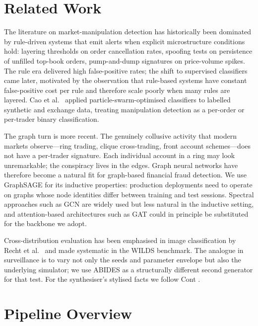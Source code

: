 \documentclass[10pt,twocolumn,letterpaper]{article}
\begin{document}
\section{Related Work}
\label{sec:related}

The literature on market-manipulation detection has historically been
dominated by rule-driven systems that emit alerts when explicit
microstructure conditions hold: layering thresholds on order
cancellation rates, spoofing tests on persistence of unfilled top-book
orders, pump-and-dump signatures on price-volume spikes. The rule era
delivered high false-positive rates; the shift to supervised classifiers
came later, motivated by the
observation that rule-based systems have constant false-positive cost
per rule and therefore scale poorly when many rules are layered.
Cao et al.\ \cite{cao2014pso} applied particle-swarm-optimised
classifiers to labelled synthetic and exchange data, treating
manipulation detection as a per-order or per-trader binary
classification.

The graph turn is more recent. The genuinely collusive activity that
modern markets observe---ring trading, clique cross-trading, front
account schemes---does not have a per-trader signature. Each individual
account in a ring may look unremarkable; the conspiracy lives in the
edges. Graph neural networks have therefore become a natural fit for
graph-based financial fraud detection. We use GraphSAGE
\cite{hamilton2017graphsage} for its inductive properties: production
deployments need to operate on graphs whose node identities differ
between training and test sessions. Spectral approaches such as GCN
\cite{kipf2017gcn} are widely used but less natural in the inductive
setting, and attention-based architectures such as GAT
\cite{velickovic2018gat} could in principle be substituted for the
backbone we adopt.

Cross-distribution evaluation has been emphasised in image
classification by Recht et al.\ \cite{recht2019imagenet} and made
systematic in the WILDS \cite{koh2021wilds} benchmark. The analogue in
surveillance is to vary not only the seeds and parameter envelope but
also the underlying simulator; we use ABIDES \cite{byrd2019abides} as
a structurally different second generator for that test. For the
synthesiser's stylised facts we follow Cont \cite{cont2001stylized}.

\section{Pipeline Overview}
\label{sec:overview}
\end{document}

